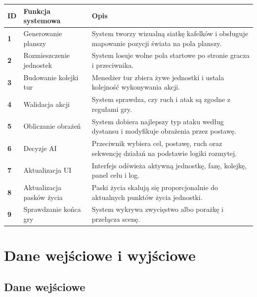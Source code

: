 \documentclass[12pt,a4paper]{article}
\begin{document}
\begin{longtable}{>{\bfseries}p{1cm} p{4.5cm} p{9cm}}
\toprule
ID & Funkcja systemowa & Opis \\
\midrule
\endhead
1 & Generowanie planszy & System tworzy wizualną siatkę kafelków i obsługuje mapowanie pozycji świata na pola planszy. \\[4pt]
2 & Rozmieszczenie jednostek & System losuje wolne pola startowe po stronie gracza i przeciwnika. \\[4pt]
3 & Budowanie kolejki tur & Menedżer tur zbiera żywe jednostki i ustala kolejność wykonywania akcji. \\[4pt]
4 & Walidacja akcji & System sprawdza, czy ruch i atak są zgodne z regułami gry. \\[4pt]
5 & Obliczanie obrażeń & System dobiera najlepszy typ ataku według dystansu i modyfikuje obrażenia przez postawę. \\[4pt]
6 & Decyzje AI & Przeciwnik wybiera cel, postawę, ruch oraz sekwencję działań na podstawie logiki rozmytej. \\[4pt]
7 & Aktualizacja UI & Interfejs odświeża aktywną jednostkę, fazę, kolejkę, panel celu i log. \\[4pt]
8 & Aktualizacja pasków życia & Paski życia skalują się proporcjonalnie do aktualnych punktów życia jednostki. \\[4pt]
9 & Sprawdzanie końca gry & System wykrywa zwycięstwo albo porażkę i przełącza scenę. \\
\bottomrule
\end{longtable}

\newpage

\section{Dane wejściowe i wyjściowe}

\subsection{Dane wejściowe}
\end{document}
